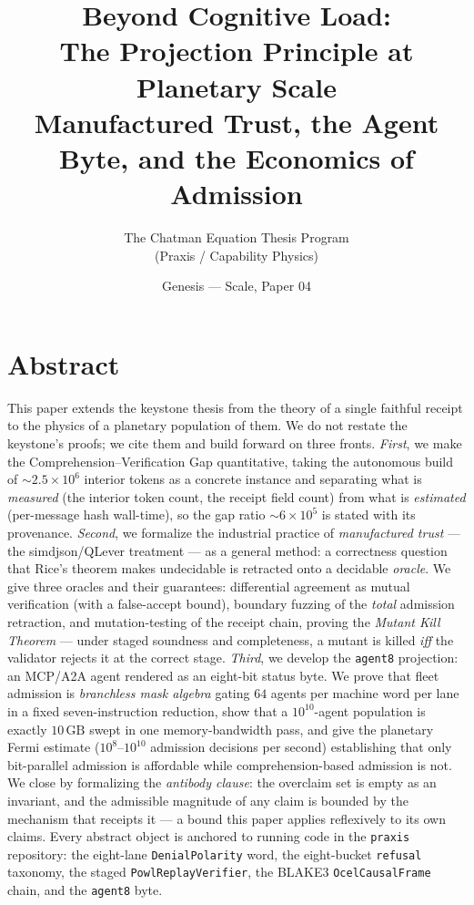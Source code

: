 \documentclass[11pt,oneside]{book}
\title{\bfseries Beyond Cognitive Load:\\[0.4em]
\large The Projection Principle at Planetary Scale\\
Manufactured Trust, the Agent Byte, and the Economics of Admission}
\author{The Chatman Equation Thesis Program \\ (Praxis / Capability Physics)}
\date{Genesis --- Scale, Paper 04}
\theoremstyle{definition}
\theoremstyle{plain}
\theoremstyle{remark}
\newcommand{\code}[1]{\texttt{#1}}
\begin{document}
\frontmatter
\maketitle

\chapter*{Abstract}
This paper extends the keystone thesis \cite{keystone} from the theory of a single faithful
receipt to the physics of a planetary population of them. We do not restate the keystone's
proofs; we cite them and build forward on three fronts. \emph{First}, we make the
Comprehension--Verification Gap quantitative, taking the autonomous build of
$\sim\!2.5\times 10^{6}$ interior tokens as a concrete instance and separating what is
\emph{measured} (the interior token count, the receipt field count) from what is
\emph{estimated} (per-message hash wall-time), so the gap ratio $\sim\!6\times 10^{5}$ is
stated with its provenance. \emph{Second}, we formalize the industrial practice of
\emph{manufactured trust} --- the simdjson/QLever treatment --- as a general method: a
correctness question that Rice's theorem \cite{rice1953} makes undecidable is retracted onto a
decidable \emph{oracle}. We give three oracles and their guarantees: differential agreement as
mutual verification (with a false-accept bound), boundary fuzzing of the \emph{total} admission
retraction, and mutation-testing of the receipt chain, proving the \emph{Mutant Kill Theorem} ---
under staged soundness and completeness, a mutant is killed \emph{iff} the validator rejects it
at the correct stage. \emph{Third}, we develop the \code{agent8} projection: an MCP/A2A agent
rendered as an eight-bit status byte. We prove that fleet admission is \emph{branchless mask
algebra} gating $64$ agents per machine word per lane in a fixed seven-instruction reduction,
show that a $10^{10}$-agent population is exactly $10\,\mathrm{GB}$ swept in one
memory-bandwidth pass, and give the planetary Fermi estimate ($10^{8}$--$10^{10}$ admission
decisions per second) establishing that only bit-parallel admission is affordable while
comprehension-based admission is not. We close by formalizing the \emph{antibody clause}: the
overclaim set is empty as an invariant, and the admissible magnitude of any claim is bounded by
the mechanism that receipts it --- a bound this paper applies reflexively to its own claims.
Every abstract object is anchored to running code in the \code{praxis} repository: the
eight-lane \code{DenialPolarity} word, the eight-bucket \code{refusal} taxonomy, the staged
\code{PowlReplayVerifier}, the BLAKE3 \code{OcelCausalFrame} chain, and the \code{agent8} byte.
\end{document}
